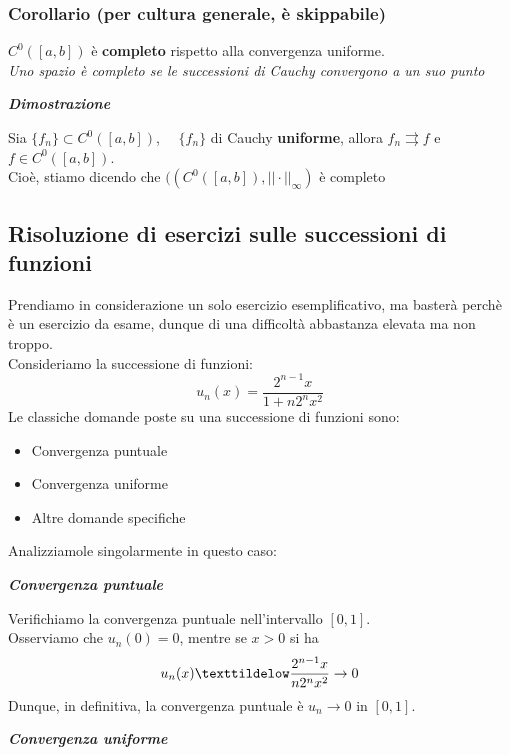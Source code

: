 \documentclass{article}
\theoremstyle{definition}
\begin{document}
\subsubsection{Corollario (per cultura generale, è skippabile)}
$C^0([a,b])$ è \textbf{completo} rispetto alla convergenza uniforme.
\\
\textit{Uno spazio è completo se le successioni di Cauchy convergono a un suo punto }
\begin{center}
    \textbf{\textit{Dimostrazione}}
\end{center}
Sia $\{f_n\} \subset C^0([a,b])$, \,\,\,\, $\{f_n\}$ di Cauchy \textbf{uniforme}, allora $f_n \rightrightarrows f$ e $f \in C^0([a,b])$.
\\
Cioè, stiamo dicendo che $((C^0([a,b]), ||\cdot ||_\infty)$ è completo

\subsection{Risoluzione di esercizi sulle successioni di funzioni}
Prendiamo in considerazione un solo esercizio esemplificativo, ma basterà perchè è un esercizio da esame, dunque di una difficoltà abbastanza elevata ma non troppo.
\\
Consideriamo la successione di funzioni:
\begin{equation}
    u_n(x)=\frac{2^{n-1}x}{1+n2^nx^2}
\end{equation}
Le classiche domande poste su una successione di funzioni sono:
\begin{itemize}
    \item Convergenza puntuale
    \item Convergenza uniforme
    \item Altre domande specifiche
\end{itemize}
Analizziamole singolarmente in questo caso:
\begin{center}
    \textbf{\textit{Convergenza puntuale}}
\end{center}
Verifichiamo la convergenza puntuale nell'intervallo $[0,1]$.
\\
Osserviamo che $u_n(0)=0$, mentre se $x > 0$ si ha 
\begin{equation}
    u_n(x) \texttildelow \frac{2^{n-1}x}{n2^nx^2} \to 0
\end{equation}
Dunque, in definitiva, la convergenza puntuale è $u_n \to 0$ in $[0,1]$.
\begin{center}
    \textbf{\textit{Convergenza uniforme}}
\end{center}
\end{document}
